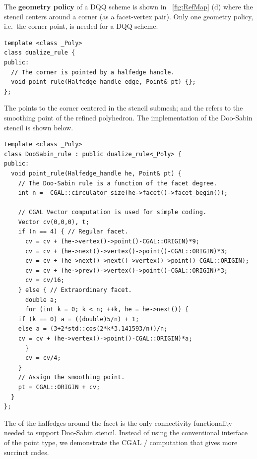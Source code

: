 \noindent The \textbf{geometry policy} of a DQQ scheme is shown in
\figurename\ \ref{fig:RefMap} (d) where the stencil centers around
a corner (as a facet-vertex pair). Only one geometry policy, i.e.\ the 
corner point, is needed for a DQQ scheme. 
\begin{lstlisting}
template <class _Poly>
class dualize_rule {
public:
  // The corner is pointed by a halfedge handle.
  void point_rule(Halfedge_handle edge, Point& pt) {};
};
\end{lstlisting}
The  points to the 
corner centered in the stencil submesh; and the 
 refers to the smoothing point
of the refined polyhedron. The implementation of the
Doo-Sabin stencil is shown below.
\begin{lstlisting}
template <class _Poly>
class DooSabin_rule : public dualize_rule<_Poly> {
public:
  void point_rule(Halfedge_handle he, Point& pt) {
    // The Doo-Sabin rule is a function of the facet degree.
    int n =  CGAL::circulator_size(he->facet()->facet_begin());

    // CGAL Vector computation is used for simple coding.
    Vector cv(0,0,0), t;
    if (n == 4) { // Regular facet.
      cv = cv + (he->vertex()->point()-CGAL::ORIGIN)*9;
      cv = cv + (he->next()->vertex()->point()-CGAL::ORIGIN)*3;
      cv = cv + (he->next()->next()->vertex()->point()-CGAL::ORIGIN);
      cv = cv + (he->prev()->vertex()->point()-CGAL::ORIGIN)*3;
      cv = cv/16;
    } else { // Extraordinary facet.
      double a;
      for (int k = 0; k < n; ++k, he = he->next()) {
	if (k == 0) a = ((double)5/n) + 1;
	else a = (3+2*std::cos(2*k*3.141593/n))/n;
	cv = cv + (he->vertex()->point()-CGAL::ORIGIN)*a;
      }
      cv = cv/4;
    }
    // Assign the smoothing point.
    pt = CGAL::ORIGIN + cv;
  }
};
\end{lstlisting}
The  of the halfedges around the 
facet is the only connectivity functionality needed 
to support Doo-Sabin stencil. 
Instead of using the conventional interface \CodeFmt{[i]} 
of the point type, we demonstrate the CGAL 
/ computation that gives
more succinct codes. 
\\

